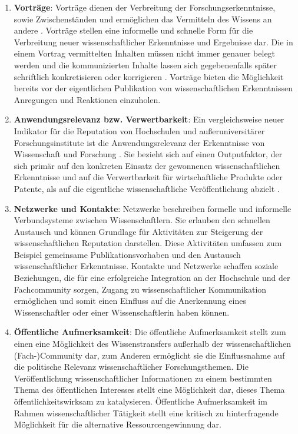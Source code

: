 \begin{enumerate}
\item \textbf{Vorträge}: Vorträge dienen der Verbreitung der Forschungserkenntnisse, sowie Zwischenständen und ermöglichen das Vermitteln des Wissens an andere \cite{rassenhoevel_2010_performancemessung}. Vorträge stellen eine informelle und schnelle Form für die Verbreitung neuer wissenschaftlicher Erkenntnisse und Ergebnisse dar. Die in einem Vortrag vermittelten Inhalten müssen nicht immer genauer belegt werden und die kommunizierten Inhalte lassen sich gegebenenfalls später schriftlich konkretisieren oder korrigieren \cite{haberle_2002_jahrbuch}. Vorträge bieten die Möglichkeit bereits vor der eigentlichen Publikation von wissenschaftlichen Erkenntnissen Anregungen und Reaktionen einzuholen.
\item\textbf{Anwendungsrelevanz bzw. Verwertbarkeit}: Ein vergleichsweise neuer Indikator für die Reputation von Hochschulen und außeruniversitärer Forschungsinstitute ist die Anwendungsrelevanz der Erkenntnisse von Wissenschaft und Forschung \cite{simon_2009_wissenschaft_governance}. Sie bezieht sich auf einen Outputfaktor, der sich primär auf den konkreten Einsatz der gewonnenen wissenschaftlichen Erkenntnisse und auf die Verwertbarkeit für wirtschaftliche Produkte oder Patente, als auf die eigentliche wissenschaftliche Veröffentlichung abzielt \cite{suchen}.
\item \textbf{Netzwerke und Kontakte}: Netzwerke beschreiben formelle und informelle Verbundsysteme zwischen Wissenschaftlern. Sie erlauben den schnellen Austausch und können Grundlage für Aktivitäten zur Steigerung der wissenschaftlichen Reputation darstellen. Diese Aktivitäten umfassen zum Beispiel gemeinsame Publikationsvorhaben und den Austausch wissenschaftlicher Erkenntnisse. Kontakte und Netzwerke schaffen soziale Beziehungen, die für eine erfolgreiche Integration an der Hochschule und der Fachcommunity sorgen, Zugang zu wissenschaftlicher Kommunikation ermöglichen und somit einen Einfluss auf die Anerkennung eines Wissenschaftler oder einer Wissenschaftlerin haben können.
\item \textbf{Öffentliche Aufmerksamkeit}: Die öffentliche Aufmerksamkeit stellt zum einen eine Möglichkeit des Wissenstransfers außerhalb der wissenschaftlichen (Fach-)Community dar, zum Anderen ermöglicht sie die Einflussnahme auf die politische Relevanz wissenschaftlicher Forschungsthemen. Die Veröffentlichung wissenschaftlicher Informationen zu einem bestimmten Thema des öffentlichen Interesses stellt eine Möglichkeit dar, dieses Thema öffentlichkeitswirksam zu katalysieren. Öffentliche Aufmerksamkeit im Rahmen wissenschaftlicher Tätigkeit stellt eine kritisch zu hinterfragende Möglichkeit für die alternative Ressourcengewinnung dar. \cite{suche}

\end{enumerate}
